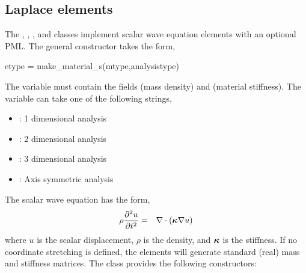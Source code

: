 \clearpage
\subsection{Laplace elements}

The , , , 
and 
classes implement scalar wave equation elements with an optional PML.
The general constructor takes the form,
\begin{codelist}
  \item[etype = make\_material\_s(mtype,analysistype)]
\end{codelist}
The variable  must contain the fields
(mass density) and (material stiffness).
The variable  can take one of the 
following strings,
\begin{itemize}
\item {}: 1 dimensional analysis
\item {}: 2 dimensional analysis
\item {}: 3 dimensional analysis
\item {}: Axis symmetric analysis
\end{itemize}
The scalar wave equation has the form,
\begin{eqnarray}
\rho \frac{\partial^2 u}{\partial t^2} &=& 
              \mathbf{\nabla}\cdot \left( \boldsymbol{\kappa} \mathbf{\nabla} u \right)
\end{eqnarray}
where $u$ is the scalar displacement, $\rho$ is the density, 
and $\boldsymbol{\kappa}$ is the stiffness. 
If no coordinate stretching is 
defined, the elements will generate standard (real) mass and 
stiffness matrices.
The class provides the following constructors:

